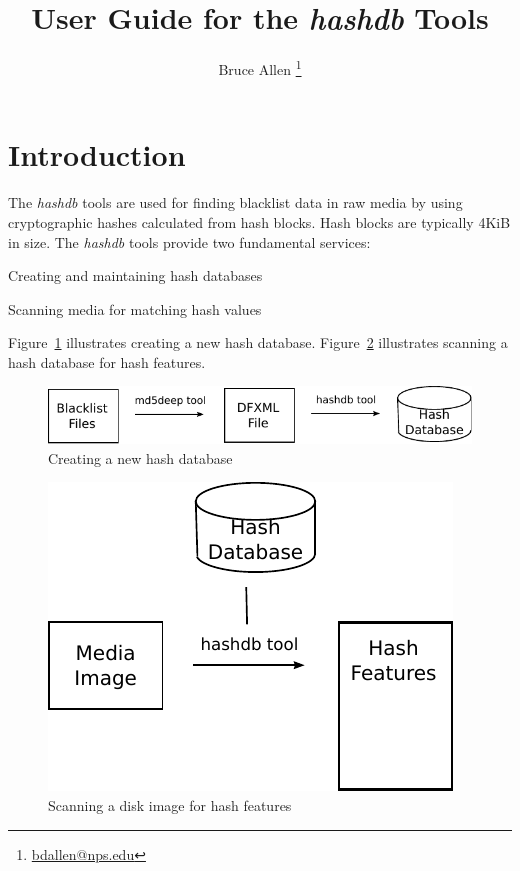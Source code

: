 \documentclass[11pt,twoside]{article}
\newcommand \hdb {\textit{hashdb}\xspace}
\begin{document}
\title{User Guide for the \hdb Tools}
\author{Bruce Allen \footnote{\href{mailto:bdallen@nps.edu}{bdallen@nps.edu}}}
\maketitle

\section{Introduction}
The \hdb tools are used for finding blacklist data in raw media
by using cryptographic hashes calculated from hash blocks.
Hash blocks are typically 4KiB in size.
The \hdb tools provide two fundamental services:
\begin{compactitem}
	\item Creating and maintaining hash databases
	\item Scanning media for matching hash values
\end{compactitem}

Figure~\ref{fig:create_hashdb} illustrates creating a new hash database.
Figure~\ref{fig:scan_hashdb} illustrates scanning a hash database
for hash features.
\begin{figure}[h]
	\center
	\includegraphics[scale=1.0]{drawings/create_hashdb.pdf}
	\caption{Creating a new hash database}
	\label{fig:create_hashdb}
\end{figure}
\begin{figure}[h]
	\center
	\includegraphics[scale=1.0]{drawings/scan_hashdb.pdf}
	\caption{Scanning a disk image for hash features}
	\label{fig:scan_hashdb}
\end{figure}
\end{document}
